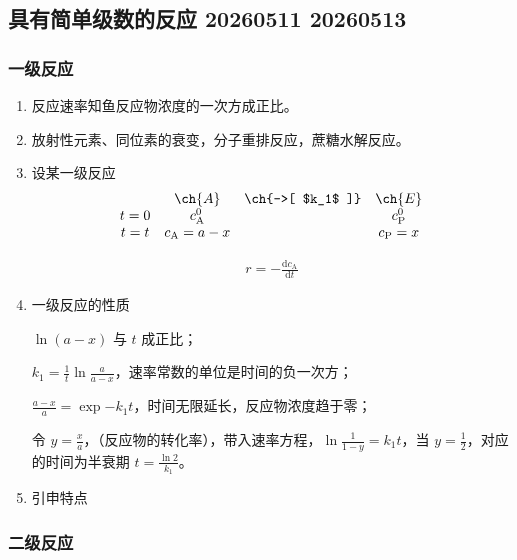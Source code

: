 \subsection{具有简单级数的反应 20260511 20260513}

\subsubsection{一级反应}

\begin{enumerate}
    \item 反应速率知鱼反应物浓度的一次方成正比。
    \item 放射性元素、同位素的衰变，分子重排反应，蔗糖水解反应。
    \item 设某一级反应
    \[
    \begin{array}{c c c c}
        & \ch{A} & \ch{->[ $k_1$ ]} & \ch{E} \\
        t = 0 & c_{\mathrm{A}}^0 & & c_{\mathrm{P}}^0 \\
        t = t & c_{\mathrm{A}} = a - x & & c_{\mathrm{P}} = x \\
    \end{array}
    \]

    \begin{equation}
        \begin{aligned}
            r = -\frac{\mathrm{d}c_{\mathrm{A}}}{\mathrm{d}t}
        \end{aligned}
    \end{equation}
    \item 一级反应的性质
    
    $\ln(a-x)$ 与 $t$ 成正比；
    
    $k_1 = \frac1t \ln{\frac{a}{a-x}}$，速率常数的单位是时间的负一次方；
    
    $\frac{a-x}{a} = \exp{-k_1t}$，时间无限延长，反应物浓度趋于零；
    
    令 $y = \frac{x}{a}$，（反应物的转化率），带入速率方程，$\ln\frac1{1-y} = k_1 t$，当 $y = \frac12$，对应的时间为半衰期 $t = \frac{\ln2}{k_1}$。
    \item 引申特点
\end{enumerate}

\subsubsection{二级反应}

